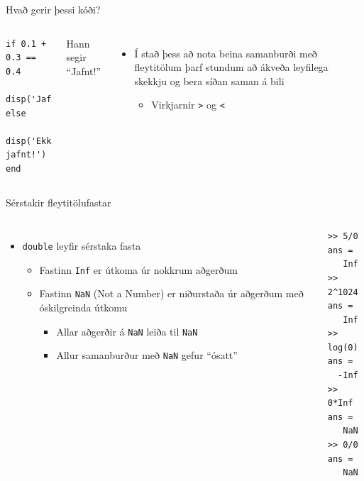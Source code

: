 \documentclass{beamer}
\begin{document}
\begin{frame}[fragile]{Hvað gerir þessi kóði?}
\begin{columns}
\begin{verbatim}
if 0.1 + 0.3 == 0.4
  disp('Jafnt!')
else
  disp('Ekki jafnt!')
end
\end{verbatim}
\pause
Hann segir ``Jafnt!''
\begin{itemize}
 \item Í stað þess að nota beina samanburði með fleytitölum þarf stundum að ákveða leyfilega skekkju og bera síðan saman á bili
 \begin{itemize}
  \item Virkjarnir \texttt{>} og \texttt{<}
 \end{itemize}
\end{itemize}
\end{columns}
\end{frame}

\begin{frame}[fragile]{Sérstakir fleytitölufastar}
\begin{columns}
\begin{itemize}
 \item \texttt{double} leyfir sérstaka fasta
 \begin{itemize}
  \item Fastinn \texttt{Inf} er útkoma úr nokkrum aðgerðum
  \item Fastinn \texttt{NaN} (Not a Number) er niðurstaða úr aðgerðum með óskilgreinda útkomu
  \begin{itemize}
   \item Allar aðgerðir á \texttt{NaN} leiða til \texttt{NaN}
   \item Allur samanburður með \texttt{NaN} gefur ``ósatt''
  \end{itemize}
 \end{itemize}
\end{itemize}
\begin{verbatim}
>> 5/0
ans =
   Inf
>> 2^1024
ans =
   Inf
>> log(0)
ans =
  -Inf
>> 0*Inf
ans =
   NaN
>> 0/0
ans =
   NaN
\end{verbatim}
\end{columns}
\end{frame}
\end{document}
